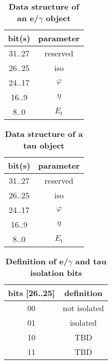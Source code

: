 \documentclass{cmspaper}
\begin{document}
\begin{table}[ht]
\caption{\bf Data structure of an e/$\gamma$ object}
\vspace{5mm}
\centering
\begin{tabular}{|c|c|}\hline
bit(s) & parameter \\\hline\hline
31..27 & reserved \\
26..25 & iso \\
24..17 & $\varphi$ \\
16..9 & $\eta$ \\
8..0 & $E_t$ \\\hline
\end{tabular}
\label{table:egamma_object}
\end{table}

\begin{table}[ht]
\caption{\bf Data structure of a tau object}
\vspace{5mm}
\centering
\begin{tabular}{|c|c|}\hline
bit(s) & parameter \\\hline\hline
31..27 & reserved \\
26..25 & iso \\
24..17 & $\varphi$ \\
16..9 & $\eta$ \\
8..0 & $E_t$ \\\hline
\end{tabular}
\label{table:tau_object}
\end{table}

\begin{table}[ht]
\caption{\bf Definition of e/$\gamma$ and tau isolation bits}
\vspace{5mm}
\centering
\begin{tabular}{|c|c|}\hline
bits [26..25] & definition \\\hline\hline
00 & not isolated \\
01 & isolated \\
10 & TBD \\
11 & TBD \\\hline
\end{tabular}
\label{table:eg_tau_iso_bits}
\end{table}
\end{document}

